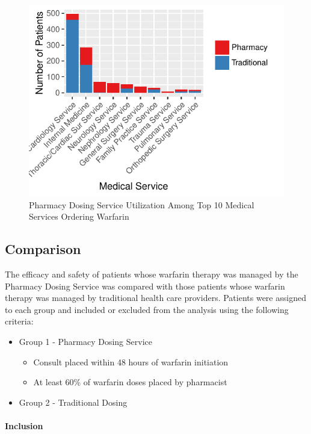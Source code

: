 \documentclass[]{article}
\providecommand{\tightlist}{%
  \setlength{\itemsep}{0pt}\setlength{\parskip}{0pt}}
\let\oldparagraph\paragraph
\renewcommand{\paragraph}[1]{\oldparagraph{#1}\mbox{}}
\begin{document}
\begin{figure}[H]
\centering
\includegraphics{warfarin_analysis_2015_files/figure-latex/ds_med_service_curr-1.pdf}
\caption{Pharmacy Dosing Service Utilization Among Top 10 Medical
Services Ordering Warfarin}
\end{figure}

\subsection{Comparison}\label{comparison}

The efficacy and safety of patients whose warfarin therapy was managed
by the Pharmacy Dosing Service was compared with those patients whose
warfarin therapy was managed by traditional health care providers.
Patients were assigned to each group and included or excluded from the
analysis using the following criteria:

\begin{itemize}
\tightlist
\item
  Group 1 - Pharmacy Dosing Service

  \begin{itemize}
  \tightlist
  \item
    Consult placed within 48 hours of warfarin initiation
  \item
    At least 60\% of warfarin doses placed by pharmacist
  \end{itemize}
\item
  Group 2 - Traditional Dosing
\end{itemize}

\paragraph{Inclusion}\label{inclusion}
\end{document}
